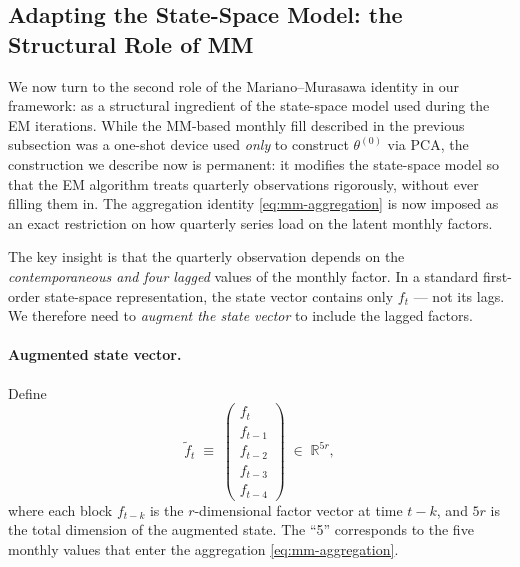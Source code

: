 \documentclass[11pt, a4paper, oneside]{article}
\begin{document}
\subsection{Adapting the State-Space Model: the Structural Role of MM}
\label{subsec:mm-augmentation}

We now turn to the second role of the Mariano--Murasawa identity in
our framework: as a structural ingredient of the state-space model
used during the EM iterations. While the MM-based monthly fill
described in the previous subsection was a one-shot device used
\emph{only} to construct $\theta^{(0)}$ via PCA, the construction we
describe now is permanent: it modifies the state-space model so that
the EM algorithm treats quarterly observations rigorously, without
ever filling them in. The aggregation identity \eqref{eq:mm-aggregation}
is now imposed as an exact restriction on how quarterly series load
on the latent monthly factors.

The key insight is that the quarterly observation depends on the
\emph{contemporaneous and four lagged} values of the monthly factor.
In a standard first-order state-space representation, the state
vector contains only $f_t$ — not its lags. We therefore need to
\emph{augment the state vector} to include the lagged factors.

\paragraph{Augmented state vector.}
Define
\begin{equation}
\tilde{f}_t \;\equiv\; \begin{pmatrix} f_t \\ f_{t-1} \\ f_{t-2} \\ f_{t-3} \\ f_{t-4} \end{pmatrix} \;\in\; \mathbb{R}^{5r},
\label{eq:mm-augmented-state}
\end{equation}
where each block $f_{t-k}$ is the $r$-dimensional factor vector at
time $t-k$, and $5r$ is the total dimension of the augmented state.
The ``5'' corresponds to the five monthly values that enter the
aggregation \eqref{eq:mm-aggregation}.
\end{document}
